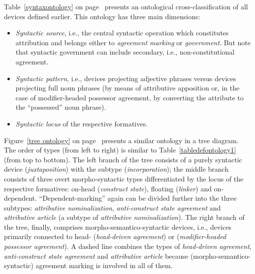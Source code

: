 Table~\ref{syntaxontology} on page~\pageref{syntaxontology} presents an ontological cross-classification of all devices defined earlier. This ontology has three main dimensions: 
\begin{itemize}
\item\textit{Syntactic source}, i.e., the central syntactic operation which constitutes attribution and belongs either to \textit{agreement marking} or \textit{government}. But note that syntactic government can include secondary, i.e., non-constitutional agreement.
\item\textit{Syntactic pattern}, i.e., devices projecting adjective phrases versus devices projecting full noun phrases (by means of attributive apposition or, in the case of modifier\hyp{}headed possessor agreement, by converting the attribute to the “possessed” noun phrase).
\item\textit{Syntactic locus} of the respective formatives.
\end{itemize}
Figure~\ref{tree ontology} on page~\pageref{tree ontology} presents a similar ontology in a tree diagram. The order of types (from left to right) is similar to Table~\ref{tabledefontology1} (from top to bottom). The left branch of the tree consists of a purely syntactic device (\textit{juxtaposition}) with the subtype (\textit{incorporation}); the middle branch consists of three overt morpho-syntactic types differentiated by the locus of the respective formatives: on-head (\textit{construct state}), floating (\textit{linker}) and on-dependent. “Dependent\hyp{}marking” again can be divided further into the three subtypes: \textit{attributive nominalization}, \textit{anti\hyp{}construct state agreement} and \textit{attributive article} (a subtype of \textit{attributive nominalization}). The right branch of the tree, finally, comprises morpho-semantico-syntactic devices, i.e., devices primarily connected to head- (\textit{head\hyp{}driven agreement}) or  (\textit{modifier\hyp{}headed possessor agreement}). A dashed line combines the types of \textit{head\hyp{}driven agreement}, \textit{anti\hyp{}construct state agreement} and \textit{attributive article} because (morpho-semantico-syntactic) agreement marking is involved in all of them.
